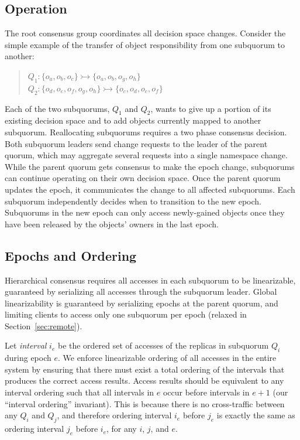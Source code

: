 \documentclass[sigconf]{acmart}
\begin{document}
\subsection{Operation}

The root consensus group coordinates all decision space changes.
Consider the simple example of the transfer of object responsibility from one subquorum
to another:

\begin{quote}
\small
   $Q_1: \{o_a,o_b,o_c\} \rightarrowtail \{o_a,o_b,o_g,o_h\}$\\
   $Q_2: \{o_d,o_e,o_f,o_g,o_h\} \rightarrowtail \{o_c,o_d,o_e,o_f\}$
\end{quote}

Each of the two subquorums, $Q_1$ and $Q_2$, wants to give up a portion of its
existing decision space and to add objects currently mapped to another subquorum.
Reallocating subquorums requires a two phase consensus decision.
Both subquorum leaders send change requests to the leader of the parent quorum, which may
aggregate several requests into a single namespace change.
While the parent quorum gets consensus to make the epoch change, subquorums can continue
operating on their own decision space.
Once the parent quorum updates the epoch, it communicates the change to all affected
subquorums.
Each subquorum independently decides when to transition to the new epoch.
Subquorums in the new epoch can only access newly-gained objects once they have been
released by the objects' owners in the last epoch.

\subsection{Epochs and Ordering}

Hierarchical consensus requires all accesses in each subquorum to be linearizable,
guaranteed by serializing all accesses through the subquorum leader.
Global linearizability is guaranteed by serializing epochs at the parent
quorum, and limiting clients to access only one subquorum per epoch (relaxed
in Section~\ref{sec:remote}).

Let \emph{interval} $i_e$ be the ordered set of accesses of the replicas in subquorum
$Q_i$ during epoch $e$.
We enforce linearizable ordering of all accesses in the entire system by
ensuring that there must exist a total ordering of the intervals that produces the correct
access results.
Access results should be equivalent to any interval ordering
such that all intervals in $e$ occur before intervals in $e+1$ (our ``interval
ordering'' invariant).
This is because there is no cross-traffic between any $Q_i$ and $Q_j$, and therefore
ordering interval $i_e$ before $j_e$ is exactly the same as ordering interval $j_e$
before $i_e$, for any $i$, $j$, and $e$.
\end{document}
